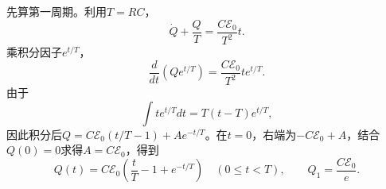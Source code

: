 \documentclass[UTF8,fontset=fandol,a4paper,11pt]{ctexart}
\begin{document}
先算第一周期。利用$T=RC$，
\[
\dot Q+\frac QT=\frac{C\mathcal E_0}{T^2}t.
\]
乘积分因子$e^{t/T}$，
\[
\frac d{dt}(Qe^{t/T})
=\frac{C\mathcal E_0}{T^2}t e^{t/T}.
\]
由于
\[
\int t e^{t/T}dt=T(t-T)e^{t/T},
\]
因此积分后$Q=C\mathcal E_0(t/T-1)+Ae^{-t/T}$。在$t=0$，右端为$-C\mathcal E_0+A$，结合$Q(0)=0$求得$A=C\mathcal E_0$，得到
\[
\boxed{Q(t)=C\mathcal E_0\left(\frac tT-1+e^{-t/T}\right)}
\quad(0\le t<T),\qquad
Q_1=\frac{C\mathcal E_0}{e}.
\]
\begin{center}\begin{minipage}{.98\linewidth}\centering
{}
\end{minipage}
\end{center}
\end{document}
